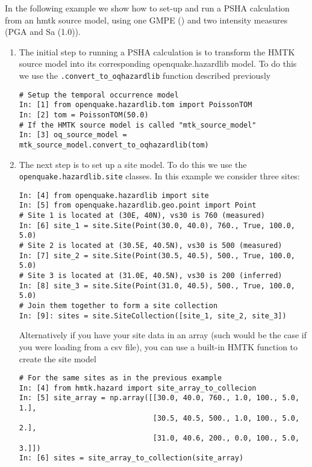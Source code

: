 In the following example we show how to set-up and run a PSHA calculation from an hmtk source model, using one GMPE (\cite{akkar2010}) and two intensity measures (PGA and Sa (1.0)). 

\begin{enumerate}

\item The initial step to running a PSHA calculation is to transform the HMTK source model into its corresponding openquake.hazardlib model. To do this we use the \verb=.convert_to_oqhazardlib= function described previously

\begin{Verbatim}[frame=single, commandchars=\\\{\}, fontsize=\scriptsize, samepage=true]
# Setup the temporal occurrence model
In: [1] from openquake.hazardlib.tom import PoissonTOM
In: [2] tom = PoissonTOM(50.0)
# If the HMTK source model is called "mtk_source_model"
In: [3] oq_source_model = mtk_source_model.convert_to_oqhazardlib(tom)
\end{Verbatim}

\item The next step is to set up a site model. To do this we use the \\ \verb=openquake.hazardlib.site= classes. In this example we consider three sites:

\begin{Verbatim}[frame=single, commandchars=\\\{\}, fontsize=\scriptsize, samepage=true]
In: [4] from openquake.hazardlib import site
In: [5] from openquake.hazardlib.geo.point import Point
# Site 1 is located at (30E, 40N), vs30 is 760 (measured)
In: [6] site_1 = site.Site(Point(30.0, 40.0), 760., True, 100.0, 5.0)
# Site 2 is located at (30.5E, 40.5N), vs30 is 500 (measured)
In: [7] site_2 = site.Site(Point(30.5, 40.5), 500., True, 100.0, 5.0)
# Site 3 is located at (31.0E, 40.5N), vs30 is 200 (inferred)
In: [8] site_3 = site.Site(Point(31.0, 40.5), 500., True, 100.0, 5.0)
# Join them together to form a site collection
In: [9]: sites = site.SiteCollection([site_1, site_2, site_3])
\end{Verbatim}

Alternatively if you have your site data in an array (such would be the case if you were loading from a csv file), you can use a built-in HMTK function to create the site model

\begin{Verbatim}[frame=single, commandchars=\\\{\}, fontsize=\scriptsize, samepage=true]
# For the same sites as in the previous example
In: [4] from hmtk.hazard import site_array_to_collecion
In: [5] site_array = np.array([[30.0, 40.0, 760., 1.0, 100., 5.0, 1.],
                               [30.5, 40.5, 500., 1.0, 100., 5.0, 2.],
                               [31.0, 40.6, 200., 0.0, 100., 5.0, 3.]])
In: [6] sites = site_array_to_collection(site_array)
\end{Verbatim}


\end{enumerate}
